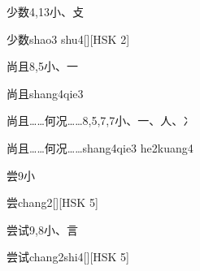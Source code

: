 \begin{entry}{少数}{4,13}{⼩、⽁}
  \begin{phonetics}{少数}{shao3 shu4}[][HSK 2]
  \end{phonetics}
\end{entry}

\begin{entry}{尚且}{8,5}{⼩、⼀}
  \begin{phonetics}{尚且}{shang4qie3}
  \end{phonetics}
\end{entry}

\begin{entry}{尚且……何况……}{8,5,7,7}{⼩、⼀、⼈、⼎}
  \begin{phonetics}{尚且……何况……}{shang4qie3 he2kuang4}
  \end{phonetics}
\end{entry}

\begin{entry}{尝}{9}{⼩}
  \begin{phonetics}{尝}{chang2}[][HSK 5]
  \end{phonetics}
\end{entry}

\begin{entry}{尝试}{9,8}{⼩、⾔}
  \begin{phonetics}{尝试}{chang2shi4}[][HSK 5]
  \end{phonetics}
\end{entry}


